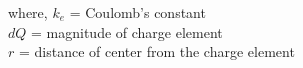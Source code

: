 \documentclass[preview]{standalone}
\begin{document}
\begin{center}
where, $k_e$ = Coulomb's constant\\$dQ$ = magnitude of charge element\\$r$ = distance of center from the charge element
\end{center}
\end{document}
